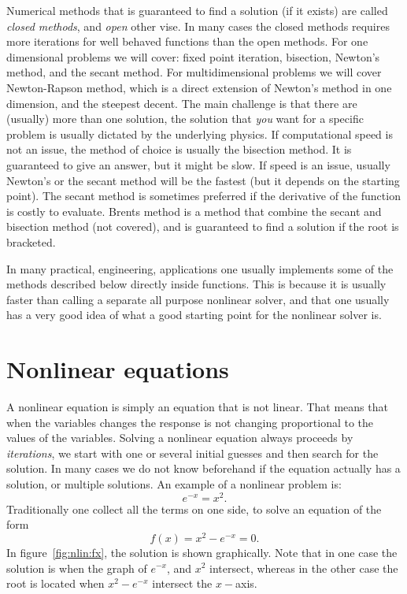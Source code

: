 \documentclass[graybox,sectrefs,envcountresetchap,open=right,final]{svmonodo}
\begin{document}
Numerical methods that is guaranteed to find a solution (if it exists) are called \emph{closed methods}, and \emph{open} other vise. In many cases the closed methods requires more iterations for well behaved functions than the open methods. For one dimensional problems we will cover: fixed point iteration, bisection, Newton's method, and the secant method.
For  multidimensional problems we will cover Newton-Rapson method, which is a direct extension of Newton's method in one
dimension, and the steepest decent. The main challenge is that there are (usually) more than one solution, the solution that
\emph{you} want for a specific problem is usually dictated by the underlying physics. If computational speed is not an issue, the
 method of choice is usually the bisection method. It is guaranteed to give an answer, but it might be slow. If speed is an issue, usually Newton's or the secant method will be the fastest (but it depends on the starting point). The secant method is sometimes preferred if the derivative of the function is costly to evaluate. Brents method is a method that combine the secant and bisection method (not covered), and is guaranteed to find a solution if the root is bracketed. 

In many practical, engineering, applications one usually implements some of the methods described below directly inside functions. This is because it is usually faster than calling a separate all purpose nonlinear solver, and that one usually has a very good idea of what a good starting point for the nonlinear solver is. 

\section{Nonlinear equations}
A nonlinear equation is simply an equation that is not linear. That means that when the variables changes the response is not changing proportional to the values of the variables. Solving a nonlinear equation always proceeds by \emph{iterations}, we start with one or several initial guesses and then search for the solution. In many cases we do not know beforehand if the equation actually has a solution, or multiple solutions. An example of a nonlinear problem is:
\begin{equation}
e^{-x}=x^2.
\label{eq:nlin:exp}
\end{equation}
Traditionally one collect all the terms on one side, to solve an equation of the form
\begin{equation}
f(x)=x^2-e^{-x}=0.
\label{eq:nlin:fx}
\end{equation}
In figure~\ref{fig:nlin:fx}, the solution is shown graphically. Note that in one case the solution is when the graph of $e^{-x}$, and $x^2$ intersect, whereas in the other case the root is located when $x^2-e^{-x}$ intersect the $x-$axis. 
\end{document}
